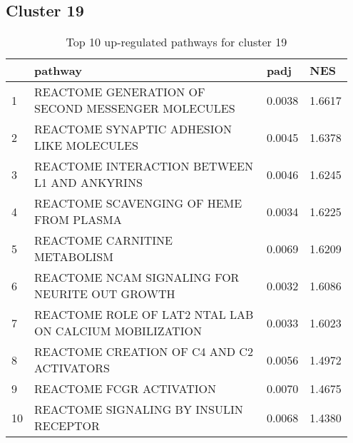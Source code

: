 \documentclass{article}
\begin{document}
\subsection{Cluster 19 }
\begin{table}[H]
\centering
\begin{tabular}{p{0.05\linewidth}p{0.7\linewidth}p{0.1\linewidth}p{0.1\linewidth}}
  \hline
 & pathway & padj & NES \\ 
  \hline
1 & REACTOME GENERATION OF SECOND MESSENGER MOLECULES & 0.0038 & 1.6617 \\ 
  2 & REACTOME SYNAPTIC ADHESION LIKE MOLECULES & 0.0045 & 1.6378 \\ 
  3 & REACTOME INTERACTION BETWEEN L1 AND ANKYRINS & 0.0046 & 1.6245 \\ 
  4 & REACTOME SCAVENGING OF HEME FROM PLASMA & 0.0034 & 1.6225 \\ 
  5 & REACTOME CARNITINE METABOLISM & 0.0069 & 1.6209 \\ 
  6 & REACTOME NCAM SIGNALING FOR NEURITE OUT GROWTH & 0.0032 & 1.6086 \\ 
  7 & REACTOME ROLE OF LAT2 NTAL LAB ON CALCIUM MOBILIZATION & 0.0033 & 1.6023 \\ 
  8 & REACTOME CREATION OF C4 AND C2 ACTIVATORS & 0.0056 & 1.4972 \\ 
  9 & REACTOME FCGR ACTIVATION & 0.0070 & 1.4675 \\ 
  10 & REACTOME SIGNALING BY INSULIN RECEPTOR & 0.0068 & 1.4380 \\ 
   \hline
\end{tabular}
\caption{Top 10 up-regulated pathways for cluster 19} 
\label{tab:q3_2_19}
\end{table}
\end{document}
